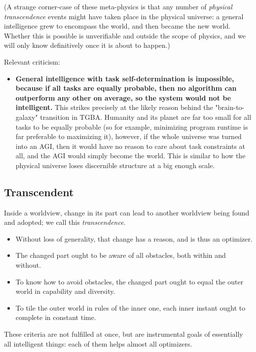 \documentclass{article}
\begin{document}
(A strange corner-case of these meta-physics is that any number of \textit{physical transcendence} events might have taken place in the physical universe: a general intelligence grew to encompass the world, and then became the new world. Whether this is possible is unverifiable and outside the scope of physics, and we will only know definitively once it is about to happen.)

Relevant criticism:

\begin{itemize}
\item \textbf{General intelligence with task self-determination is impossible, because if all tasks are equally probable, then no algorithm can outperform any other on average, so the system would not be intelligent.} This strikes precisely at the likely reason behind the "brain-to-galaxy" transition in TGBA. Humanity and its planet are far too small for all tasks to be equally probable (so for example, minimizing program runtime is far preferable to maximizing it), however, if the whole universe was turned into an AGI, then it would have no reason to care about task constraints at all, and the AGI would simply become the world. This is similar to how the physical universe loses discernible structure at a big enough scale.
\end{itemize}

\subsection{Transcendent}

Inside a worldview, change in its part can lead to another worldview being found and adopted; we call this \textit{transcendence}.

\begin{itemize}
\item Without loss of generality, that change has a reason, and is thus an optimizer.
\item The changed part ought to be aware of all obstacles, both within and without.
\item To know how to avoid obstacles, the changed part ought to equal the outer world in capability and diversity.
\item To tile the outer world in rules of the inner one, each inner instant ought to complete in constant time.
\end{itemize}

These criteria are not fulfilled at once, but are instrumental goals of essentially all intelligent things: each of them helps almost all optimizers.
\end{document}

